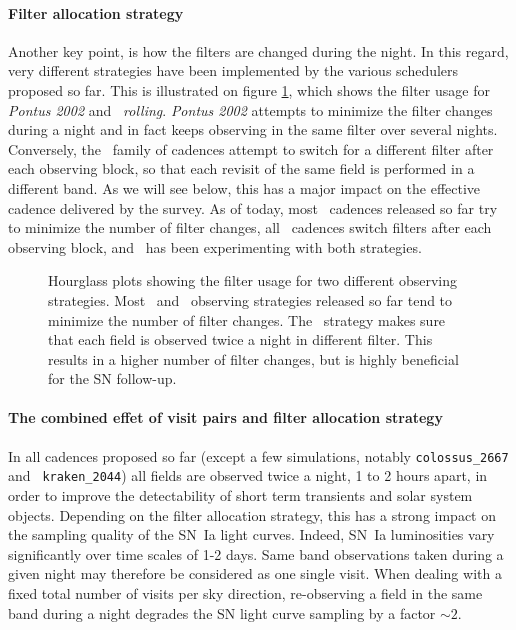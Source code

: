 \paragraph{Filter allocation strategy} Another key point, is how the filters are
changed during the night.  In this regard, very different strategies
have been implemented by the various schedulers proposed so far.  This
is illustrated on figure \ref{fig:hourglass_plot_filter_alloc}, which
shows the filter usage for  {\em Pontus 2002} and {\em
  \altsched~rolling}.  {\em Pontus 2002} attempts to minimize the
filter changes during a night and in fact keeps observing in the same
filter over several nights.  Conversely, the \altsched~family of
cadences attempt to switch for a different filter after each observing
block, so that each revisit of the same field is performed in a
different band.  As we will see below, this has a major impact on the effective cadence
delivered by the survey. As of today, most \opsim~cadences released so
far try to minimize the number of filter changes, all \altsched~cadences
switch filters after each observing block, and \slair~has been
experimenting with both strategies.

\begin{figure}
  \begin{center}
    \caption{Hourglass plots showing the filter usage for two
      different observing strategies. Most \opsim~and \slair~observing
      strategies released so far tend to minimize the number of filter
      changes. The \altschedsched~strategy makes sure that each field is
      observed twice a night in different filter. This results in a
      higher number of filter changes, but is highly beneficial for
      the SN follow-up. }
    \label{fig:hourglass_plot_filter_alloc}
  \end{center}
\end{figure}

\paragraph{The combined effet of visit pairs and filter allocation strategy} In all cadences proposed so far
(except a few simulations, notably {\tt colossus\_2667} and {\tt
  kraken\_2044}) all fields are observed twice a night, 1 to 2 hours
apart, in order to improve the detectability of short term transients
and solar system objects.  Depending on the filter allocation
strategy, this has a strong impact on the sampling quality of the
SN~Ia light curves.  Indeed, SN~Ia luminosities vary significantly
over time scales of 1-2 days.  Same band observations taken during a
given night may therefore be considered as one single visit. When
dealing with a fixed total number of visits per sky direction,
re-observing a field in the same band during a night degrades the SN
light curve sampling by a factor $\sim 2$.

